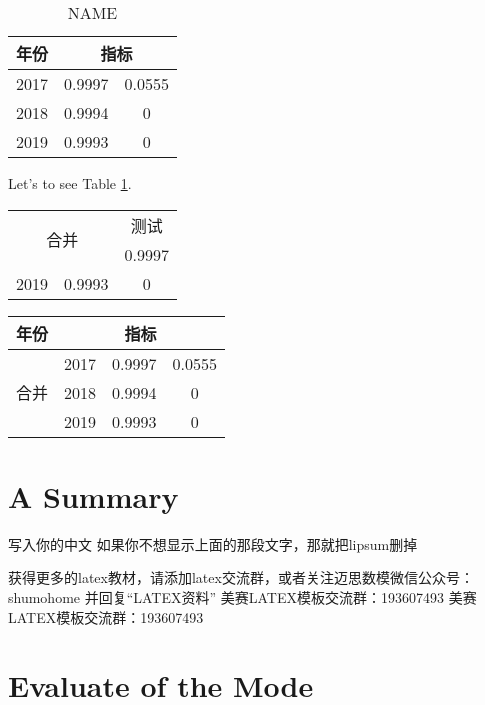 \documentclass{mcmthesis}
\begin{document}
\begin{table}[h]
  \centering
  \begin{tabular}{c|cc}
\hline
年份 & \multicolumn{2}{c}{指标}\\
\hline
2017 & 0.9997 & 0.0555 \\
2018 & 0.9994 & 0      \\
2019 & 0.9993 & 0      \\
\hline
\end{tabular}
  \caption{NAME}\label{SIGN}
\end{table}

Let's to see Table \ref{SIGN}.


\begin{minipage}{0.5\linewidth}
\begin{tabular}{|c|c|c|}
\hline
\multicolumn{2}{|c|}{\multirow{2}{*}{合并}}&测试\\
\cline{3-3}
\multicolumn{2}{|c|}{}& 0.9997  \\
\hline
2019 & 0.9993 & 0 \\
\hline
\end{tabular}
\end{minipage}
\begin{minipage}{0.5\linewidth}
\begin{tabular}{c|ccc}
\hline
年份 & \multicolumn{3}{c}{指标}\\
\hline
\multirow{3}{*}{合并}&2017 & 0.9997 & 0.0555 \\
&2018 & 0.9994 & 0      \\
&2019 & 0.9993 & 0      \\
\hline
\end{tabular}
\end{minipage}





\section{A Summary}


写入你的中文
如果你不想显示上面的那段文字，那就把lipsum删掉

获得更多的latex教材，请添加latex交流群，或者关注迈思数模微信公众号：shumohome
并回复“LATEX资料”
美赛LATEX模板交流群：193607493
美赛LATEX模板交流群：193607493

\section{Evaluate of the Mode}
\end{document}
